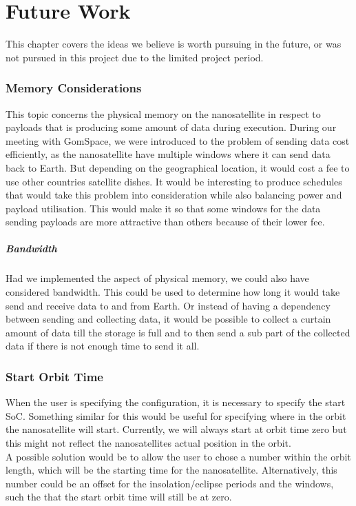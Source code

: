 \chapter{Future Work} \label{sec:future}
This chapter covers the ideas we believe is worth pursuing in the future, or was not pursued in this project due to the limited project period.

\subsection*{Memory Considerations}
This topic concerns the physical memory on the nanosatellite in respect to payloads that is producing some amount of data during execution. 
During our meeting with GomSpace, we were introduced to the problem of sending data cost efficiently, as the nanosatellite have multiple windows where it can send data back to Earth. 
But depending on the geographical location, it would cost a fee to use other countries satellite dishes.
It would be interesting to produce schedules that would take this problem into consideration while also balancing power and payload utilisation.
This would make it so that some windows for the data sending payloads are more attractive than others because of their lower fee\cite{gom_space_conversation}.
\paragraph*{Bandwidth}
Had we implemented the aspect of physical memory, we could also have considered bandwidth. This could be used to determine how long it would take send and receive data to and from Earth. Or instead of having a dependency between sending and collecting data, it would be possible to collect a curtain amount of data till the storage is full and to then send a sub part of the collected data if there is not enough time to send it all.

\subsection*{Start Orbit Time}
When the user is specifying the configuration, it is necessary to specify the start SoC. Something similar for this would be useful for specifying where in the orbit the nanosatellite will start. Currently, we will always start at orbit time zero but this might not reflect the nanosatellites actual position in the orbit.\\
A possible solution would be to allow the user to chose a number within the orbit length, which will be the starting time for the nanosatellite. Alternatively, this number could be an offset for the insolation/eclipse periods and the windows, such the that the start orbit time will still be at zero.

